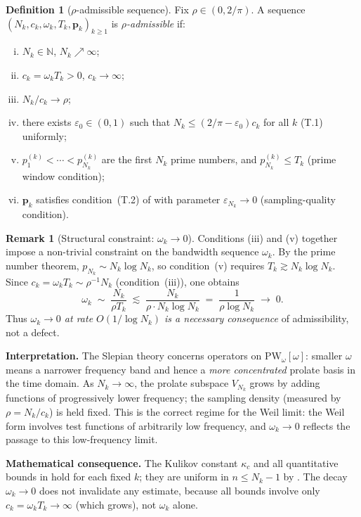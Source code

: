 \documentclass[12pt,a4paper]{amsart}
\theoremstyle{definition}
\newtheorem{definition}[theorem]{Definition}
\newtheorem{remark}[theorem]{Remark}
\newcommand{\PW}{\mathrm{PW}_\omega}
\newcommand{\Kul}{\kappa_c}
\begin{document}
\begin{definition}[$\rho$-admissible sequence]\label{def:admissible}
Fix $\rho\in(0,2/\pi)$. A sequence $(N_k,c_k,\omega_k,T_k,
\mathbf{p}_k)_{k\geq1}$ is \emph{$\rho$-admissible} if:
\begin{enumerate}[(i)]
\item $N_k\in\mathbb{N}$, $N_k\nearrow\infty$;
\item $c_k=\omega_k T_k>0$, $c_k\to\infty$;
\item $N_k/c_k\to\rho$;
\item there exists $\varepsilon_0\in(0,1)$ such that
$N_k\leq(2/\pi-\varepsilon_0)c_k$ for all $k$ \textup{(T.1) uniformly};
\item $p_1^{(k)}<\cdots<p_{N_k}^{(k)}$ are the first $N_k$ prime
numbers, and $p_{N_k}^{(k)}\leq T_k$ \textup{(prime window condition)};
\item $\mathbf{p}_k$ satisfies condition~(T.2) of \cite{PaperI}
with parameter $\varepsilon_{N_k}\to0$
\textup{(sampling-quality condition)}.
\end{enumerate}
\end{definition}

\begin{remark}[Structural constraint: $\omega_k\to0$]
\label{rem:omega_to_zero}
Conditions (iii) and (v) together impose a non-trivial constraint
on the bandwidth sequence $\omega_k$. By the prime number theorem,
$p_{N_k}\sim N_k\log N_k$, so condition~(v) requires
$T_k\gtrsim N_k\log N_k$. Since $c_k=\omega_k T_k\sim\rho^{-1}N_k$
(condition~(iii)), one obtains
\[
  \omega_k\;\sim\;\frac{N_k}{\rho T_k}
  \;\lesssim\;\frac{N_k}{\rho\cdot N_k\log N_k}
  \;=\;\frac{1}{\rho\log N_k}\;\to\;0.
\]
Thus \emph{$\omega_k\to0$ at rate $O(1/\log N_k)$ is a necessary
consequence} of admissibility, not a defect.

\medskip
\noindent\textbf{Interpretation.}
The Slepian theory concerns operators on $\PW[\omega]$:
smaller $\omega$ means a narrower frequency band and hence
a \emph{more concentrated} prolate basis in the time domain.
As $N_k\to\infty$, the prolate subspace $V_{N_k}$ grows by
adding functions of progressively lower frequency; the sampling
density (measured by $\rho=N_k/c_k$) is held fixed.
This is the correct regime for the Weil limit: the Weil form
involves test functions of arbitrarily low frequency, and
$\omega_k\to0$ reflects the passage to this low-frequency limit.

\medskip
\noindent\textbf{Mathematical consequence.}
The Kulikov constant $\Kul$ and all quantitative bounds
in \cite{PaperI} hold for each fixed $k$; they are uniform in
$n\leq N_k-1$ by \cite{Kulikov2023}. The decay $\omega_k\to0$
does not invalidate any estimate, because all bounds involve
only $c_k=\omega_k T_k\to\infty$ (which grows), not
$\omega_k$ alone.
\end{remark}
\end{document}

